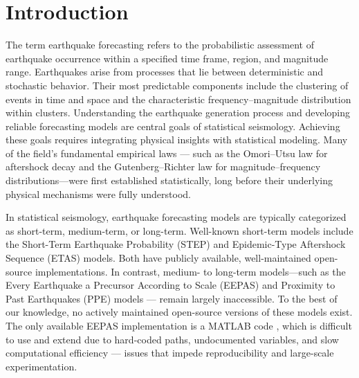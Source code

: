 \documentclass[linenum,doublespace,onecolumn]{SSA-SRL}
\theoremstyle{lemma}
\begin{document}
\maketitle

\section{Introduction}

The term earthquake forecasting refers to the probabilistic assessment of earthquake occurrence within a specified time frame, region, and magnitude range. Earthquakes arise from processes that lie between deterministic and stochastic behavior. Their most predictable components include the clustering of events in time and space and the characteristic frequency–magnitude distribution within clusters. Understanding the earthquake generation process and developing reliable forecasting models are central goals of statistical seismology. Achieving these goals requires integrating physical insights with statistical modeling. Many of the field’s fundamental empirical laws — such as the Omori–Utsu law for aftershock decay and the Gutenberg–Richter law for magnitude–frequency distributions—were first established statistically, long before their underlying physical mechanisms were fully understood.

In statistical seismology, earthquake forecasting models are typically categorized as short-term, medium-term, or long-term. Well-known short-term models include the Short-Term Earthquake Probability (STEP) and Epidemic-Type Aftershock Sequence (ETAS) models. Both have publicly available, well-maintained open-source implementations. In contrast, medium- to long-term models—such as the Every Earthquake a Precursor According to Scale (EEPAS) and Proximity to Past Earthquakes (PPE) models — remain largely inaccessible. To the best of our knowledge, no actively maintained open-source versions of these models exist. The only available EEPAS implementation is a MATLAB code \cite{2023ER}, which is difficult to use and extend due to hard-coded paths, undocumented variables, and slow computational efficiency — issues that impede reproducibility and large-scale experimentation.
\end{document}
